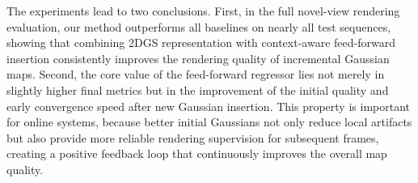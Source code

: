 \documentclass[letterpaper, 10pt, conference]{ieeeconf}
\newcommand{\datasetname}[1]{\mbox{\normalfont\itshape #1}}
\begin{document}
\begin{table}[!t]
\centering
\caption{Ablation study on early convergence of the feed-forward regressor on \datasetname{hku\_campus\_00}. Values are averaged over valid training frames; bold indicates the better result at each step.}
\label{tab:ablation_curves}
\renewcommand{\arraystretch}{1.18}
\end{table}

The experiments lead to two conclusions. First, in the full novel-view rendering evaluation, our method outperforms all baselines on nearly all test sequences, showing that combining 2DGS representation with context-aware feed-forward insertion consistently improves the rendering quality of incremental Gaussian maps. Second, the core value of the feed-forward regressor lies not merely in slightly higher final metrics but in the improvement of the initial quality and early convergence speed after new Gaussian insertion. This property is important for online systems, because better initial Gaussians not only reduce local artifacts but also provide more reliable rendering supervision for subsequent frames, creating a positive feedback loop that continuously improves the overall map quality.

\end{document}
